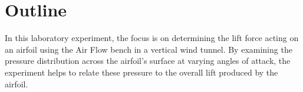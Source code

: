 \section{Outline}
\FloatBarrier %

In this laboratory experiment, the focus is on determining the lift force acting on an airfoil using the Air Flow bench in a vertical wind tunnel. By examining the pressure distribution across the airfoil's surface at varying angles of attack, the experiment helps to relate these pressure to the overall lift produced by the airfoil.


